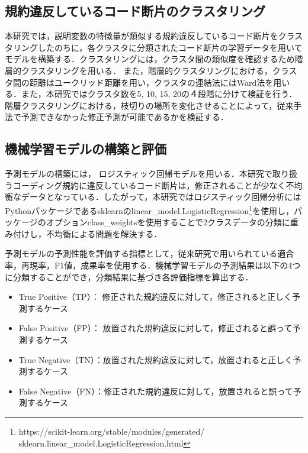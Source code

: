 \documentclass[T,J]{fose} %
\newcommand{\todo}[1]{\colorbox{yellow}{{\bf TODO}:}{\color{red} {\textbf{[#1]}}}}
\begin{document}
\subsection{規約違反しているコード断片のクラスタリング}

本研究では，説明変数の特徴量が類似する規約違反しているコード断片をクラスタリングしたのちに，各クラスタに分類されたコード断片の学習データを用いてモデルを構築する．クラスタリングには，クラスタ間の類似度を確認するため階層的クラスタリングを用いる．
また，階層的クラスタリングにおける，クラスタ間の距離はユークリッド距離を用い，クラスタの連結法にはWard法を用いる．また，本研究ではクラスタ数を5, 10, 15, 20の４段階に分けて検証を行う．階層クラスタリングにおける，枝切りの場所を変化させることによって，従来手法で予測できなかった修正予測が可能であるかを検証する．


\subsection{機械学習モデルの構築と評価}

予測モデルの構築には，
ロジスティック回帰モデルを用いる．本研究で取り扱うコーディング規約に違反しているコード断片は，修正されることが少なく不均衡なデータとなっている．したがって，本研究ではロジスティック回帰分析にはPythonパッケージであるsklearnのlinear\_model.LogisticRegression\footnote{https://scikit-learn.org/stable/modules/generated/\\sklearn.linear\_model.LogisticRegression.html}を使用し，パッケージのオプションclass\_weightsを使用することで2クラスデータの分類に重み付けし，不均衡による問題を解決する．

予測モデルの予測性能を評価する指標として，従来研究で用いられている適合率，再現率，F1値，成果率を使用する．機械学習モデルの予測結果は以下の4つに分類することができ，分類結果に基づき各評価指標を算出する．
\begin{itemize}
\item True Positive（TP）： 修正された規約違反に対して，修正されると正しく予測するケース
\item False Positive（FP）： 放置された規約違反に対して，修正されると誤って予測するケース
\item True Negative（TN）：放置された規約違反に対して，放置されると正しく予測するケース
\item False Negative（FN）：修正された規約違反に対して，放置されると誤って予測するケース
\end{itemize}
\end{document}
